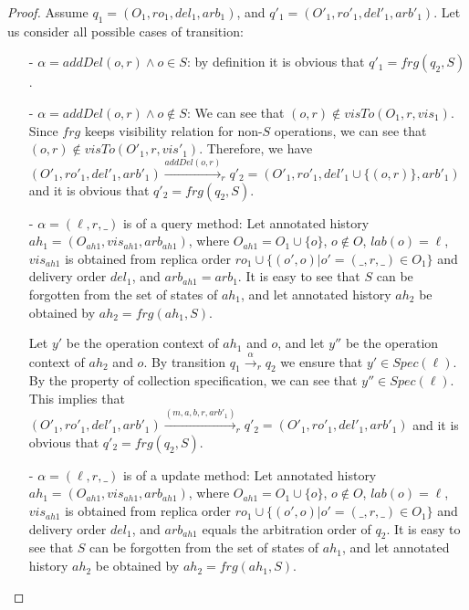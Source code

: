 \begin {proof} 

Assume $q_1 = (O_1,\mathit{ro}_1,\mathit{del}_1,\mathit{arb}_1)$, and $q'_1 = (O'_1,\mathit{ro}'_1,\mathit{del}'_1,\mathit{arb}'_1)$. Let us consider all possible cases of transition: 

\begin{itemize}
\setlength{\itemsep}{0.5pt}
\item[-] $\alpha = \mathit{addDel}(o,r) \wedge o \in S$: by definition it is obvious that $q'_1 = \mathit{frg}(q_2,S)$. 

\item[-] $\alpha = \mathit{addDel}(o,r) \wedge o \notin S$: We can see that $(o,r)\notin visTo(O_1,r,\mathit{vis}_1)$. Since $\mathit{frg}$ keeps visibility relation for non-$S$ operations, we can see that $(o,r)\notin visTo(O'_1,r,\mathit{vis}'_1)$. Therefore, we have $ (O'_1,\mathit{ro}'_1,\mathit{del}'_1,\mathit{arb}'_1) {\xrightarrow{addDel(o,r)}}_r q'_2 = (O'_1,\mathit{ro}'_1,\mathit{del}'_1 \cup \{ (o,r) \},\mathit{arb}'_1)$ and it is obvious that $q'_2 = \mathit{frg}(q_2,S)$.

\item[-] $\alpha = (\ell,r,\_)$ is of a query method: Let annotated history $\mathit{ah}_1 = (O_{\mathit{ah1}},\mathit{vis}_{\mathit{ah1}},\mathit{arb}_{\mathit{ah1}})$, where $O_{\mathit{ah1}} = O_1 \cup \{ o \}$, $o \notin O$, $\mathit{lab}(o)=\ell$, $\mathit{vis}_{\mathit{ah1}}$ is obtained from replica order $\mathit{ro}_1 \cup \{ (o',o) \vert o' = (\_,r,\_) \in O_1\}$ and delivery order $\mathit{del}_1$, and $\mathit{arb}_{\mathit{ah1}} = \mathit{arb}_1$. It is easy to see that $S$ can be forgotten from the set of states of $\mathit{ah}_1$, and let annotated history $\mathit{ah}_2$ be obtained by $\mathit{ah}_2 = \mathit{frg}(\mathit{ah}_1,S)$.
    
    Let $y'$ be the operation context of $\mathit{ah}_1$ and $o$, and let $y''$ be the operation context of $\mathit{ah}_2$ and $o$. By transition $q_1 {\xrightarrow{\alpha}}_r q_2$ we ensure that $y' \in \mathit{Spec}(\ell)$. By the property of collection specification, we can see that $y'' \in \mathit{Spec}(\ell)$. This implies that $(O'_1,\mathit{ro}'_1,\mathit{del}'_1,\mathit{arb}'_1) {\xrightarrow{(m,a,b,r,\mathit{arb}'_1)}}_r q'_2 = (O'_1,\mathit{ro}'_1,\mathit{del}'_1,\mathit{arb}'_1)$ and it is obvious that $q'_2 = \mathit{frg}(q_2,S)$.

\item[-] $\alpha = (\ell,r,\_)$ is of a update method: Let annotated history $\mathit{ah}_1 = (O_{\mathit{ah1}},\mathit{vis}_{\mathit{ah1}},\mathit{arb}_{\mathit{ah1}})$, where $O_{\mathit{ah1}} = O_1 \cup \{ o \}$, $o \notin O$, $\mathit{lab}(o)=\ell$, $\mathit{vis}_{\mathit{ah1}}$ is obtained from replica order $\mathit{ro}_1 \cup \{ (o',o) \vert o' = (\_,r,\_) \in O_1\}$ and delivery order $\mathit{del}_1$, and $\mathit{arb}_{\mathit{ah1}}$ equals the arbitration order of $q_2$. It is easy to see that $S$ can be forgotten from the set of states of $\mathit{ah}_1$, and let annotated history $\mathit{ah}_2$ be obtained by $\mathit{ah}_2 = \mathit{frg}(\mathit{ah}_1,S)$. 


\end{itemize}
\end{proof}

